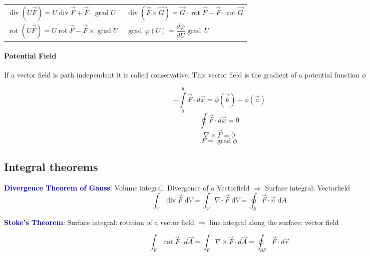 {\begin{tabularx}{\textwidth}{|X|X|}
		$	\operatorname{div}(U\vec{F})=U\operatorname{div}\vec{F}+\vec{F}\cdot\operatorname{grad}U $&
		$\operatorname{div}(\vec{F}\times \vec{G})= \vec{G} \cdot\operatorname{rot}\vec{F} -\vec{F}\cdot\operatorname{rot}\vec{G} $ \\				

		$\operatorname{rot}(U\vec{F})= U\operatorname{rot}\vec{F}-\vec{F}\times\operatorname{grad}U\ $& 
		$\operatorname{grad}\,\varphi(U) = \dfrac{d\varphi}{dU}\operatorname{grad}\,U$
		\\
		\hline
	
		
	\end{tabularx}
}
\renewcommand{\arraystretch}{1.2}		

	\paragraph{Potential Field}
		If a vector field is path independant it is called conservative. This vector field is the gradient of a potential function $\phi$
		
		\begin{multicols}{3}
			$$ -\int\limits_a^b \vec F\cdot d\vec x = \phi(\vec b) - \phi(\vec a) $$ \vfill\columnbreak
			$$ \oint \vec F\cdot d\vec x = 0 $$ 
			$$ \nabla \times \vec F = 0  $$ \vfill\columnbreak
			$$ F = \operatorname{grad}\phi $$
		\end{multicols}
		
		
		
	

	\subsection{Integral theorems}
	
		
		\textcolor{blue}{\textbf{Divergence Theorem of Gauss}}: Volume integral: Divergence of a Vectorfield $\Rightarrow$ Surface integral: Vectorfield\\
		
		$$\int_V \operatorname{div} \vec{F} \; \mathrm dV = 
				\int_V \nabla\cdot \vec{F} \; \mathrm dV =
				\oint_{S} \vec F \cdot\vec n\; \mathrm dA
		$$

	\textcolor{blue}{\textbf{Stoke's Theorem}}: Surface integral: rotation of a vector field $\Rightarrow$ line integral along the surface: vector field  
	
	$$\int_{F} \operatorname{rot} \vec F \cdot d \vec A =
		\int_{F} \nabla \times \vec F \cdot d \vec A =
		\oint_{\partial F} \vec F \cdot d \vec r $$
	


	
